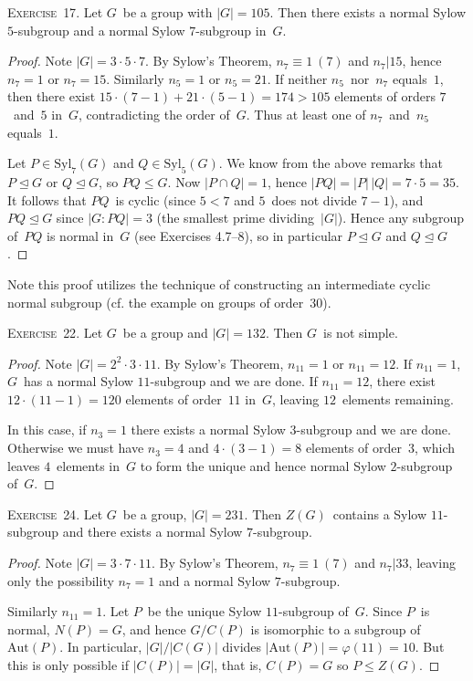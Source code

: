 \documentclass[letterpaper]{article}
\newcommand{\exercise}[1]{\goodbreak\noindent\textsc{Exercise~{#1}.}}
\newcommand{\sect}{\cap}
\newcommand{\subgroup}{\le}
\newcommand{\normal}{\trianglelefteq}
\newcommand{\aut}{\mathrm{Aut}}
\newcommand{\syl}{\mathrm{Syl}}
\newcommand{\ord}[1]{|{#1}|}
\newcommand{\gindex}[2]{|{#1}:{#2}|}
\begin{document}
\exercise{17}
Let $G$~be a group with $\ord{G}=105$. Then there exists a normal Sylow $5$-subgroup and a normal Sylow $7$-subgroup in~$G$.
\begin{proof}
Note $\ord{G}=3\cdot5\cdot7$. By Sylow's Theorem, $n_7\equiv1\ (7)$ and $n_7|15$, hence $n_7=1$ or $n_7=15$. Similarly $n_5=1$ or $n_5=21$. If neither $n_5$~nor~$n_7$ equals~$1$, then there exist $15\cdot(7-1)+21\cdot(5-1)=174>105$ elements of orders $7$~and~$5$ in~$G$, contradicting the order of~$G$. Thus at least one of $n_7$~and~$n_5$ equals~$1$.

Let $P\in\syl_7(G)$ and $Q\in\syl_5(G)$. We know from the above remarks that $P\normal G$ or $Q\normal G$, so $PQ\subgroup G$. Now $\ord{P\sect Q}=1$, hence $\ord{PQ}=\ord{P}\,\ord{Q}=7\cdot5=35$. It follows that $PQ$~is cyclic (since $5<7$ and $5$~does not divide $7-1$), and $PQ\normal G$ since $\gindex{G}{PQ}=3$ (the smallest prime dividing~$\ord{G}$). Hence any subgroup of~$PQ$ is normal in~$G$ (see Exercises 4.7--8), so in particular $P\normal G$ and $Q\normal G$.
\end{proof}
\noindent Note this proof utilizes the technique of constructing an intermediate cyclic normal subgroup (cf. the example on groups of order~$30$).

\bigskip
\exercise{22}
Let $G$~be a group and $\ord{G}=132$. Then $G$~is not simple.
\begin{proof}
Note $\ord{G}=2^2\cdot 3\cdot 11$. By Sylow's Theorem, $n_{11}=1$ or $n_{11}=12$. If $n_{11}=1$, $G$~has a normal Sylow $11$-subgroup and we are done. If $n_{11}=12$, there exist $12\cdot(11-1)=120$ elements of order~$11$ in~$G$, leaving $12$~elements remaining.

In this case, if $n_3=1$ there exists a normal Sylow $3$-subgroup and we are done. Otherwise we must have $n_3=4$ and $4\cdot(3-1)=8$ elements of order~$3$, which leaves $4$~elements in~$G$ to form the unique and hence normal Sylow $2$-subgroup of~$G$.
\end{proof}

\exercise{24}
Let $G$~be a group, $\ord{G}=231$. Then $Z(G)$~contains a Sylow $11$-subgroup and there exists a normal Sylow $7$-subgroup.
\begin{proof}
Note $\ord{G}=3\cdot 7\cdot 11$. By Sylow's Theorem, $n_7\equiv1\ (7)$ and $n_7|33$, leaving only the possibility $n_7=1$ and a normal Sylow $7$-subgroup.

Similarly $n_{11}=1$. Let $P$~be the unique Sylow $11$-subgroup of~$G$. Since $P$~is normal, $N(P)=G$, and hence $G/C(P)$ is isomorphic to a subgroup of~$\aut(P)$. In particular, $\ord{G}/\ord{C(G)}$ divides $\ord{\aut(P)}=\varphi(11)=10$. But this is only possible if $\ord{C(P)}=\ord{G}$, that is, $C(P)=G$ so $P\subgroup Z(G)$. 
\end{proof}
\end{document}
